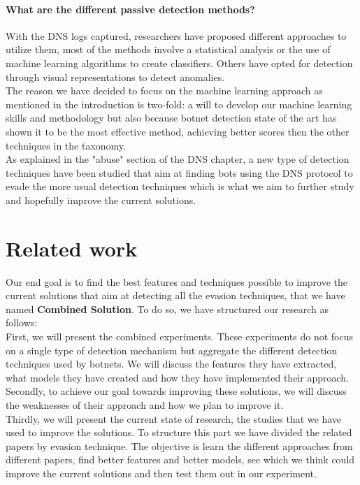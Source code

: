 \paragraph{What are the different passive detection methods?}
With the DNS logs captured, researchers have proposed different approaches to utilize them, most of the methods involve a statistical analysis or the use of machine learning algorithms to create classifiers. Others have opted for detection through visual representations to detect anomalies.\\
The reason we have decided to focus on the machine learning approach as mentioned in the introduction is two-fold: a will to develop our machine learning skills and methodology but also because botnet detection state of the art has shown it to be the most effective method, achieving better scores then the other techniques in the taxonomy.\\
As explained in the "abuse" section of the DNS chapter, a new type of detection techniques have been studied that aim at finding bots using the DNS protocol to evade the more usual detection techniques which is what we aim to further study and hopefully improve the current solutions.

\section{Related work}
Our end goal is to find the best features and techniques possible to improve the current solutions that aim at detecting all the evasion techniques, that we have named \textbf{Combined Solution}. To do so, we have structured our research as follows:\\
First, we will present the combined experiments. These experiments do not focus on a single type of detection mechanism but aggregate the different detection techniques used by botnets. We will discuss the features they have extracted, what models they have created and how they have implemented their approach.\\
Secondly, to achieve our goal towards improving these solutions, we will discuss the weaknesses of their approach and how we plan to improve it.\\
Thirdly, we will present the current state of research, the studies that we have used to improve the solutions. To structure this part we have divided the related papers by evasion technique.
The objective is learn the different approaches from different papers, find better features and better models, see which we think could improve the current solutions and then test them out in our experiment.

